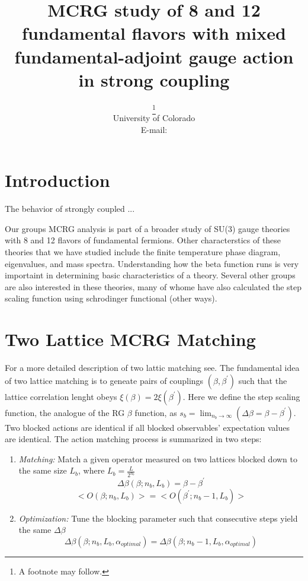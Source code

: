 \documentclass{PoS}
\title{MCRG study of 8 and 12 fundamental flavors with mixed fundamental-adjoint gauge action in strong coupling}
\author{\speaker{Gregory Petropoulos}%
         \thanks{A footnote may follow.}\\
        University of Colorado\\
        E-mail: \email{gregory.petropoulos@colorado.edu}}
\begin{document}
\section{Introduction}
The behavior of strongly coupled ...

Our groups MCRG analysis is part of a broader study of SU(3) gauge theories with 8 and 12 flavors of fundamental fermions.  Other characterstics of these theories that we have studied include the finite temperature phase diagram, eigenvalues, and mass spectra.  Understanding how the beta function runs is very importaint in determining basic characteristics of a theory.  Several other groups are also interested in these theories, many of whome have also calculated the step scaling function using schrodinger functional (other ways).  

\section{Two Lattice MCRG Matching}
For a more detailed description of two lattic matching see\cite{annaMCRG}.  The fundamental idea of two lattice matching is to geneate pairs of couplings $(\beta, \beta^{\prime})$ such that the lattice correlation lenght obeys $\xi(\beta)=2\xi(\beta^{\prime})$.  Here we define the step scaling function, the analogue of the RG $\beta$ function, as $s_b= \lim_{n_b\to\infty}(\Delta\beta=\beta − \beta^{\prime})$.  Two blocked actions are identical if all blocked observables' expectation values are identical.  The action matching process is summarized in two steps:

\begin{enumerate}
\item \emph{Matching:}  Match a given operator measured on two lattices blocked down to the same size $L_b$, where $L_b=\frac{L}{2^{n_b}}$
\begin{equation}
\Delta\beta(\beta;n_b,L_b)=\beta-\beta^{\prime}
\end{equation}
\begin{equation}
<O(\beta;n_b,L_b)>=<O(\beta^{\prime};n_b-1,L_b)>
\end{equation}
\item \emph{Optimization:}  Tune the blocking parameter such that consecutive steps yield the same $\Delta\beta$
\begin{equation}
\Delta\beta(\beta;n_b,L_b,\alpha_{optimal})=\Delta\beta(\beta;n_b-1,L_b,\alpha_{optimal})
\end{equation}
\end{enumerate}
\end{document}
